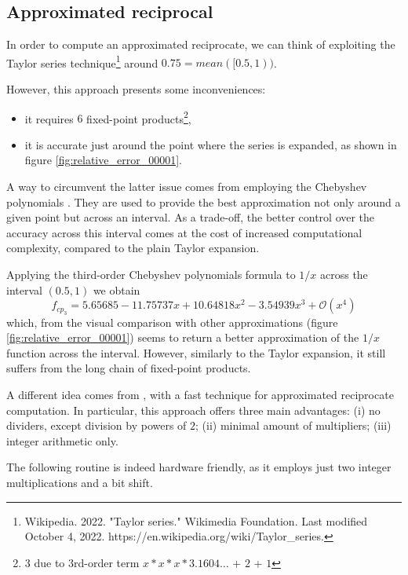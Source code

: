 \subsection{Approximated reciprocal}

In order to compute an approximated reciprocate, we can think of exploiting the Taylor series technique\footnote{Wikipedia. 2022. "Taylor series." Wikimedia Foundation. Last modified October 4, 2022. https://en.wikipedia.org/wiki/Taylor\_series.} around $ 0.75 = mean([0.5, 1))$.


However, this approach presents some inconveniences:
\begin{itemize}
\item it requires $6$ fixed-point products\footnote{$3$ due to 3rd-order term $x*x*x*3.1604\dots$ + $2$ + $1$},
\item it is accurate just around the point where the series is expanded, as shown in figure \ref{fig:relative_error_00001}.
\end{itemize}
A way to circumvent the latter issue comes from employing the Chebyshev polynomials \cite{Hale2015}. They are used to provide the best approximation not only around a given point but across an interval.
As a trade-off, the better control over the accuracy across this interval comes at the cost of increased computational complexity, compared to the plain Taylor expansion.


Applying the third-order Chebyshev polynomials formula to $1/x$ across the interval $(0.5, 1)$ we obtain
\begin{equation}\label{equ:3rd_order_Chebyshev_polynomial_equation}
f_{cp_3} = 5.65685 - 11.75737x + 10.64818x^2 - 3.54939 x^3 + \mathcal{O}(x^4)
\end{equation}
which, from the visual comparison with other approximations (figure \ref{fig:relative_error_00001}) seems to return a better approximation of the $1/x$ function across the interval. However, similarly to the Taylor expansion, it still suffers from the long chain of fixed-point products.

A different idea comes from \cite{drom}, with a fast technique for approximated reciprocate computation. In particular, this approach offers three main advantages: (i) no dividers, except division by powers of $2$; (ii) minimal amount of multipliers; (iii) integer arithmetic only.


The following routine is indeed hardware friendly, as it employs just two integer multiplications and a bit shift.

